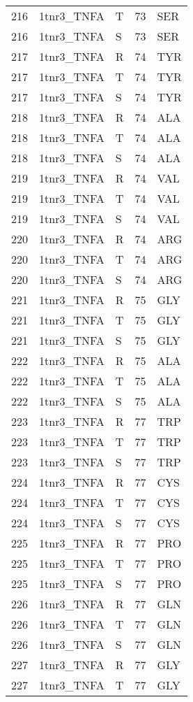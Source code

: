 \begin{tiny}
\begin{longtable}[l]{l|l|l|l|l}
	216 & 1tnr3\_TNFA & T & 73 & SER \\
	216 & 1tnr3\_TNFA & S & 73 & SER \\
	217 & 1tnr3\_TNFA & R & 74 & TYR \\
	217 & 1tnr3\_TNFA & T & 74 & TYR \\
	217 & 1tnr3\_TNFA & S & 74 & TYR \\
	218 & 1tnr3\_TNFA & R & 74 & ALA \\
	218 & 1tnr3\_TNFA & T & 74 & ALA \\
	218 & 1tnr3\_TNFA & S & 74 & ALA \\
	219 & 1tnr3\_TNFA & R & 74 & VAL \\
	219 & 1tnr3\_TNFA & T & 74 & VAL \\
	219 & 1tnr3\_TNFA & S & 74 & VAL \\
	220 & 1tnr3\_TNFA & R & 74 & ARG \\
	220 & 1tnr3\_TNFA & T & 74 & ARG \\
	220 & 1tnr3\_TNFA & S & 74 & ARG \\
	221 & 1tnr3\_TNFA & R & 75 & GLY \\
	221 & 1tnr3\_TNFA & T & 75 & GLY \\
	221 & 1tnr3\_TNFA & S & 75 & GLY \\
	222 & 1tnr3\_TNFA & R & 75 & ALA \\
	222 & 1tnr3\_TNFA & T & 75 & ALA \\
	222 & 1tnr3\_TNFA & S & 75 & ALA \\
	223 & 1tnr3\_TNFA & R & 77 & TRP \\
	223 & 1tnr3\_TNFA & T & 77 & TRP \\
	223 & 1tnr3\_TNFA & S & 77 & TRP \\
	224 & 1tnr3\_TNFA & R & 77 & CYS \\
	224 & 1tnr3\_TNFA & T & 77 & CYS \\
	224 & 1tnr3\_TNFA & S & 77 & CYS \\
	225 & 1tnr3\_TNFA & R & 77 & PRO \\
	225 & 1tnr3\_TNFA & T & 77 & PRO \\
	225 & 1tnr3\_TNFA & S & 77 & PRO \\
	226 & 1tnr3\_TNFA & R & 77 & GLN \\
	226 & 1tnr3\_TNFA & T & 77 & GLN \\
	226 & 1tnr3\_TNFA & S & 77 & GLN \\
	227 & 1tnr3\_TNFA & R & 77 & GLY \\
	227 & 1tnr3\_TNFA & T & 77 & GLY \\

\end{longtable}
\end{tiny}
